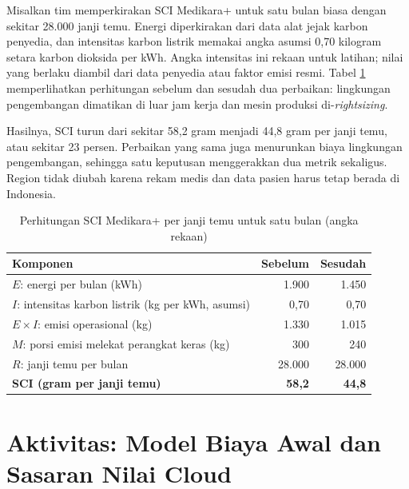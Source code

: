 \begin{kasus}[title={Kasus Medikara Health: SCI per Janji Temu Medikara+}]
  Misalkan tim memperkirakan SCI Medikara+ untuk satu bulan biasa dengan sekitar 28.000 janji temu.
  Energi diperkirakan dari data alat jejak karbon penyedia, dan intensitas karbon listrik memakai
  angka asumsi 0,70 kilogram setara karbon dioksida per kWh. Angka intensitas ini rekaan untuk
  latihan; nilai yang berlaku diambil dari data penyedia atau faktor emisi resmi. Tabel
  \ref{tab:ch03-sci-medikara} memperlihatkan perhitungan sebelum dan sesudah dua perbaikan:
  lingkungan pengembangan dimatikan di luar jam kerja dan mesin produksi di-\textit{rightsizing}.

  Hasilnya, SCI turun dari sekitar 58,2 gram menjadi 44,8 gram per janji temu, atau sekitar 23
  persen. Perbaikan yang sama juga menurunkan biaya lingkungan pengembangan, sehingga satu keputusan
  menggerakkan dua metrik sekaligus. Region tidak diubah karena rekam medis dan data pasien harus
  tetap berada di Indonesia.
\end{kasus}

\begin{table}[!htb]
  \centering
  \caption{Perhitungan SCI Medikara+ per janji temu untuk satu bulan
           (angka rekaan)}
  \label{tab:ch03-sci-medikara}
  \footnotesize
  \begin{tabularx}{\textwidth}{>{\raggedright\arraybackslash}X r r}
    \hline
    \textbf{Komponen} & \textbf{Sebelum} & \textbf{Sesudah} \\ \hline
    $E$: energi per bulan (kWh) & 1.900 & 1.450 \\ \hline
    $I$: intensitas karbon listrik (kg per kWh, asumsi) & 0,70 & 0,70 \\ \hline
    $E \times I$: emisi operasional (kg) & 1.330 & 1.015 \\ \hline
    $M$: porsi emisi melekat perangkat keras (kg) & 300 & 240 \\ \hline
    $R$: janji temu per bulan & 28.000 & 28.000 \\ \hline
    \textbf{SCI (gram per janji temu)} & \textbf{58,2} & \textbf{44,8} \\ \hline
  \end{tabularx}
\end{table}

\section{Aktivitas: Model Biaya Awal dan Sasaran Nilai Cloud}

